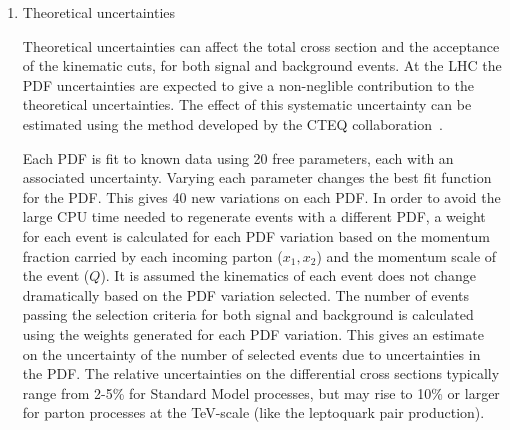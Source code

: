 \begin{enumerate}
\item Theoretical uncertainties 

Theoretical uncertainties can affect the total cross section and the acceptance of the kinematic cuts, for both signal 
and background events. 
At the LHC the PDF uncertainties are expected to give a non-neglible
contribution to the theoretical uncertainties.  
The effect of this systematic uncertainty can be estimated 
using the method developed by the CTEQ collaboration~\cite{PDFRescaling,Martin:2003sk}.

Each PDF is fit to known data using 20 free parameters, each with an associated uncertainty.  Varying each parameter changes the best fit function for the PDF.  
This gives 40 new variations on each PDF.  
In order to avoid the large CPU time needed to regenerate events with a different PDF, a weight for each event is calculated for each PDF variation 
based on the momentum fraction carried by each incoming parton ($x_1, x_2$) and the momentum scale of the event ($Q$).  
It is assumed the kinematics of each event does not change dramatically based on the PDF variation selected.
The number of events passing the selection criteria for both signal and background is calculated using the weights generated for each PDF variation.  
This gives an estimate on the uncertainty of the number of selected events due to uncertainties in the PDF.
The relative uncertainties on the differential cross sections 
typically range from 2-5\% for Standard Model processes, 
but may rise to 10\% or larger for parton processes at the TeV-scale 
(like the leptoquark pair production).

\end{enumerate}
%
%
